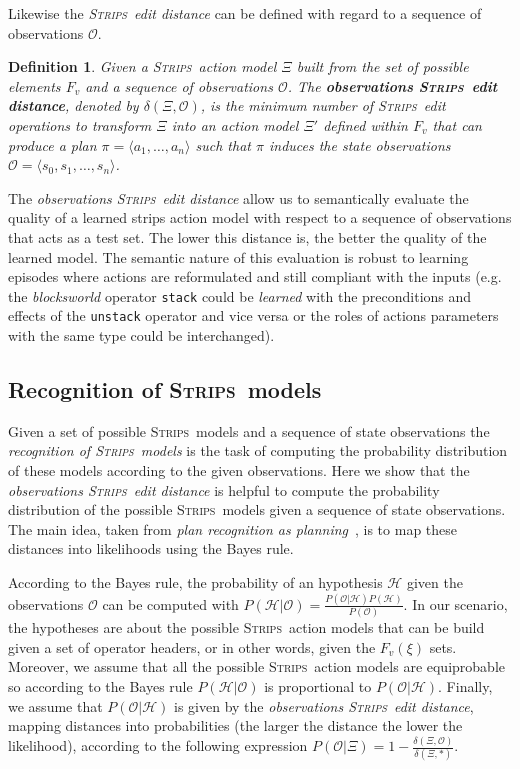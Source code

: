 \documentclass{article}
\newcommand{\tup}[1]{{\langle #1 \rangle}}
\newcommand{\strips}{\textsc{Strips}}     %
\newtheorem{definition}[theorem]{Definition}
\begin{document}
Likewise the {\em \strips\ edit distance} can be defined with regard to a sequence of observations $\mathcal{O}$.
\begin{definition}
 Given a \strips\ action model $\Xi$ built from the set of possible elements $F_v$ and a sequence of observations $\mathcal{O}$. The {\em \bf observations  \strips\ edit distance}, denoted by  $\delta(\Xi,\mathcal{O})$, is the minimum number of {\em \strips\ edit operations} to transform $\Xi$ into an action model $\Xi'$ defined within $F_v$ that can produce a plan $\pi=\tup{a_1, \ldots, a_n}$ such that $\pi$ induces the state observations $\mathcal{O}=\tup{s_0, s_1, \ldots, s_n}$.
\end{definition}

The {\em observations  \strips\ edit distance} allow us to semantically evaluate the quality of a learned strips action model with respect to a sequence of observations that acts as a test set. The lower this distance is, the better the quality of the learned model. The semantic nature of this evaluation is robust to learning episodes where actions are reformulated and still compliant with the inputs (e.g. the {\em blocksworld} operator {\small\tt stack} could be {\em learned} with the preconditions and effects of the {\small\tt unstack} operator and vice versa or the roles of actions parameters with the same type could be interchanged).


\subsection{Recognition of \strips\ models}
Given a set of possible \strips\ models and a sequence of state observations the {\em recognition of \strips\ models} is the task of computing the probability distribution of these models according to the given observations. Here we show that the {\em observations  \strips\ edit distance} is helpful to compute the probability distribution of the possible \strips\ models given a sequence of state observations. The main idea, taken from {\em plan recognition as planning}~\cite{ramirez2009plan}, is to map these distances into likelihoods using the Bayes rule.

According to the Bayes rule, the probability of an hypothesis $\mathcal{H}$ given the observations $\mathcal{O}$ can be computed with $P(\mathcal{H}|\mathcal{O})=\frac{P(\mathcal{O}|\mathcal{H})P(\mathcal{H})}{P(\mathcal{O})}$. In our scenario, the hypotheses are about the possible \strips\ action models that can be build given a set of operator headers, or in other words, given the $F_v(\xi)$ sets. Moreover, we assume that all the possible \strips\ action models are equiprobable so according to the Bayes rule $P(\mathcal{H}|\mathcal{O})$ is proportional to $P(\mathcal{O}|\mathcal{H})$. Finally, we assume that $P(\mathcal{O}|\mathcal{H})$ is given by the {\em observations  \strips\ edit distance}, mapping distances into probabilities (the larger the distance the lower the likelihood), according to the following expression $P(\mathcal{O}|\Xi)=1-\frac{\delta(\Xi,\mathcal{O})}{\delta(\Xi,*)}$.
\end{document}
